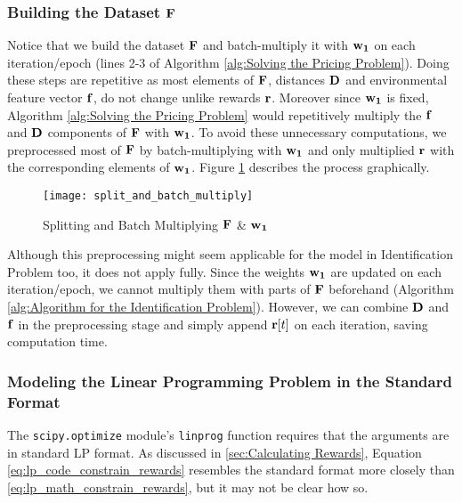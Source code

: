 \begin{appendices}
    \subsubsection{Building the Dataset $\mathbf{F}$}
    Notice that we build the dataset $\mathbf{F}$ and batch-multiply it with $\mathbf{w_1}$ on each iteration/epoch (lines 2-3 of Algorithm \ref{alg:Solving the Pricing Problem}). Doing these steps are repetitive as most elements of $\mathbf{F}$, distances $\mathbf{D}$ and environmental feature vector $\mathbf{f}$, do not change unlike rewards $\mathbf{r}$. Moreover since $\mathbf{w_1}$ is fixed, Algorithm \ref{alg:Solving the Pricing Problem} would repetitively multiply the $\mathbf{f}$ and $\mathbf{D}$ components of $\mathbf{F}$ with $\mathbf{w_1}$. To avoid these unnecessary computations, we preprocessed most of $\mathbf{F}$ by batch-multiplying with $\mathbf{w_1}$ and only multiplied $\mathbf{r}$ with the corresponding elements of $\mathbf{w_1}$. Figure \ref{fig:Splitting and Batch Multiplying F and w1} describes the process graphically.\\
    \begin{figure}[!htbp]
        \centering
        \texttt{[image: split\_and\_batch\_multiply]}
        \caption{Splitting and Batch Multiplying $\mathbf{F}$ \& $\mathbf{w_1}$}
        \label{fig:Splitting and Batch Multiplying F and w1}
    \end{figure}    
    Although this preprocessing might seem applicable for the model in Identification Problem too, it does not apply fully. Since the weights $\mathbf{w_1}$ are updated on each iteration/epoch, we cannot multiply them with parts of $\mathbf{F}$ beforehand (Algorithm \ref{alg:Algorithm for the Identification Problem}). However, we can combine $\mathbf{D}$ and $\mathbf{f}$ in the preprocessing stage and simply append $\mathbf{r}[t]$ on each iteration, saving computation time.
    
    \subsubsection{Modeling the Linear Programming Problem in the Standard Format}
    The \texttt{scipy.optimize} module's \texttt{linprog} function requires that the arguments are in standard LP format. As discussed in \cref{sec:Calculating Rewards}, Equation \ref{eq:lp_code_constrain_rewards} resembles the standard format more closely than \ref{eq:lp_math_constrain_rewards}, but it may not be clear how so.\\
    

\end{appendices}
